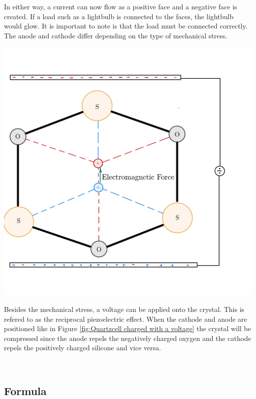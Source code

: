 In either way, a current can now flow as a positive face and a negative face is created. If a load such as a lightbulb is connected to the faces, the lightbulb would glow. It is important to note is that the load must be connected correctly. The anode and cathode differ depending on the type of mechanical stress.\\
\begin{minipage}{0.33\textwidth}
    \includegraphics[width=\textwidth]{./Figure_4.jpg}
    \label{fig:Quartzcell charged with a voltage}
\end{minipage}
\begin{minipage}{0.66\textwidth}
    Besides the mechanical stress, a voltage can be applied onto the crystal. This is refered to as the reciprocal piezoelectric effect. When the cathode and anode are positioned like in  Figure \ref{fig:Quartzcell charged with a voltage} the crystal will be compressed since the anode repels the negatively charged oxygen and the cathode repels the positively charged silicone and vice versa.\\
\end{minipage}
\\
 
\subsection{Formula}

